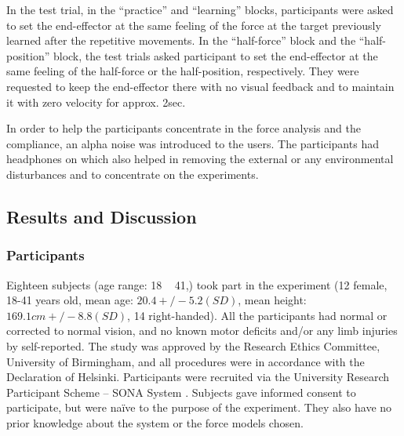 In the test trial, in the “practice” and “learning” blocks, participants were asked to set the end-effector at the same feeling of the force at the target previously learned after the repetitive movements. In the “half-force” block and the “half-position” block, the test trials asked participant to set the end-effector at the same feeling of the half-force or the half-position, respectively. They were requested to keep the end-effector there with no visual feedback and to maintain it with zero velocity for approx. 2sec.

In order to help the participants concentrate in the force analysis and the compliance, an alpha noise was introduced to the users. The participants had headphones on which also helped in removing the external or any environmental disturbances and to concentrate on the experiments.

\subsection{Results and Discussion}
\subsubsection{Participants}
Eighteen subjects (age range: 18 ~ 41,) took part in the experiment (12 female, 18-41 years old, mean age: $20.4 +/- 5.2 (SD)$, mean height: $169.1 cm +/- 8.8 (SD)$, 14 right-handed). All the participants had normal or corrected to normal vision, and no known motor deficits and/or any limb injuries by self-reported. The study was approved by the Research Ethics Committee, University of Birmingham, and all procedures were in accordance with the Declaration of Helsinki. Participants were recruited via the University Research Participant Scheme – SONA System . Subjects gave informed consent to participate, but were naïve to the purpose of the experiment. They also have no prior knowledge about the system or the force models chosen.

